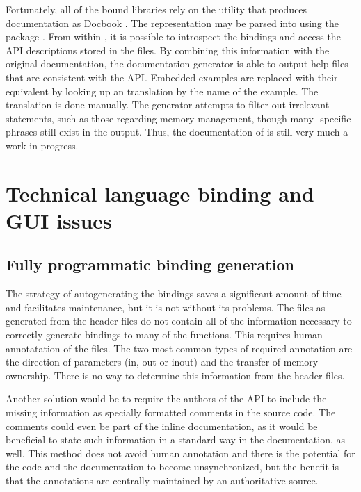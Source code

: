 \documentclass[article,shortnames]{jss}
\begin{document}
Fortunately, all of the bound libraries rely on the 
utility that 
produces documentation as Docbook . The 
representation may be
parsed into  using the  package \citep{XML}. From
within , it is possible
to introspect the bindings and access the API descriptions stored
in the  files. By combining this information with the
original 
documentation, the documentation generator is able to output
 help
files that are consistent with the  API. Embedded
examples are replaced with their  equivalent by looking up
an  translation by the name of the example. The
translation is
done manually. The generator attempts to filter out irrelevant
statements, 
such as those  regarding memory management, though many
-specific 
phrases still exist in the output. Thus, the documentation of
is still very much a work in progress.

\section{Technical language binding and GUI issues}

\subsection{Fully programmatic binding generation}

The strategy of autogenerating the bindings saves a significant amount
of time and facilitates maintenance, but it is not without its
problems.
The  files as generated from the header files do not
contain all
of the information necessary to correctly generate bindings to many
of the  functions. This requires human annotatation of the
files.  The two most common types of required annotation are the
direction
of parameters (in, out or inout) and the transfer of memory ownership.
There is no way to determine this information from the header files. 

Another solution would be to require the authors of the API to include
the missing information as specially formatted comments in the source
code. The comments could even be part of the inline documentation, as
it would be beneficial to state such information in a standard way in
the documentation, as well. This method does not avoid human
annotation and there is the potential for the code and the
documentation to become unsynchronized, but the benefit is that the
annotations are centrally maintained by an authoritative source.
\end{document}
